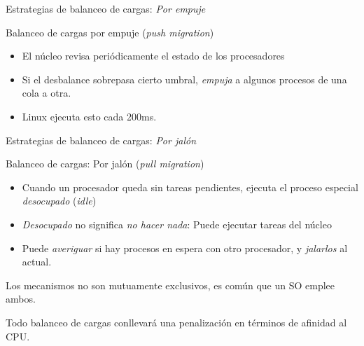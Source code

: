 \documentclass[presentation]{beamer}
\begin{document}
\begin{frame}[label={sec:org853ddc5}]{Estrategias de balanceo de cargas: \emph{Por empuje}}
\begin{center}
Balanceo de cargas por empuje (\emph{push migration})
\end{center}
\begin{itemize}
\item El núcleo revisa periódicamente el estado de los procesadores
\item Si el desbalance sobrepasa cierto umbral, \emph{empuja} a algunos
procesos de una cola a otra.
\item Linux ejecuta esto cada 200ms.
\end{itemize}
\end{frame}

\begin{frame}[label={sec:orgca843af}]{Estrategias de balanceo de cargas: \emph{Por jalón}}
\begin{center}
Balanceo de cargas: Por jalón (\emph{pull migration})
\end{center}
\begin{itemize}
\item Cuando un procesador queda sin tareas pendientes, ejecuta el
proceso especial \emph{desocupado} (\emph{idle})
\item \emph{Desocupado} no significa \emph{no hacer nada}: Puede ejecutar tareas
del núcleo
\item Puede \emph{averiguar} si hay procesos en espera con otro procesador,
y \emph{jalarlos} al actual.
\end{itemize}

\begin{center}
Los mecanismos no son mutuamente exclusivos, es común que un SO emplee
ambos.

Todo balanceo de cargas conllevará una penalización en términos de
afinidad al CPU.
\end{center}
\end{frame}
\end{document}
